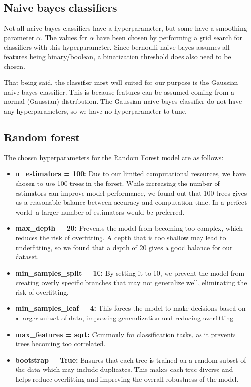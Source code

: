 \subsection{Naive bayes classifiers}
Not all naive bayes classifiers have a hyperparameter, but some have a smoothing parameter $\alpha$. The values for $\alpha$ have been chosen by performing a grid search for classifiers with this hyperparameter. Since bernoulli naive bayes assumes all features being binary/boolean, a binarization threshold does also need to be chosen. 
\par
That being said, the classifier most well suited for our purpose is the Gaussian naive bayes classifier. This is because features can be assumed coming from a normal (Gaussian) distribution. The Gaussian naive bayes classifier do not have any hyperparameters, so we have no hyperparameter to tune. 

\subsection{Random forest}
The chosen hyperparameters for the Random Forest model are as follows:

\begin{itemize}
    \item \textbf{n\_estimators = 100:} Due to our limited computational resources, we have chosen to use 100 trees in the forest. While increasing the number of estimators can improve model performance, we found out that 100 trees gives us a reasonable balance between accuracy and computation time. In a perfect world, a larger number of estimators would be preferred.
    
    \item \textbf{max\_depth = 20:} Prevents the model from becoming too complex, which reduces the risk of overfitting. A depth that is too shallow may lead to underfitting, so we found that a depth of 20 gives a good balance for our dataset.
    
    \item \textbf{min\_samples\_split = 10:} By setting it to 10, we prevent the model from creating overly specific branches that may not generalize well, eliminating the risk of overfitting.
    
    \item \textbf{min\_samples\_leaf = 4:} This forces the model to make decisions based on a larger subset of data, improving generalization and reducing overfitting. 
    
    \item \textbf{max\_features = sqrt:} Commonly for classification tasks, as it prevents trees becoming too correlated.
    
    \item \textbf{bootstrap = True:} Ensures that each tree is trained on a random subset of the data which may include duplicates. This makes each tree diverse and helps reduce overfitting and improving the overall robustness of the model.
\end{itemize}
